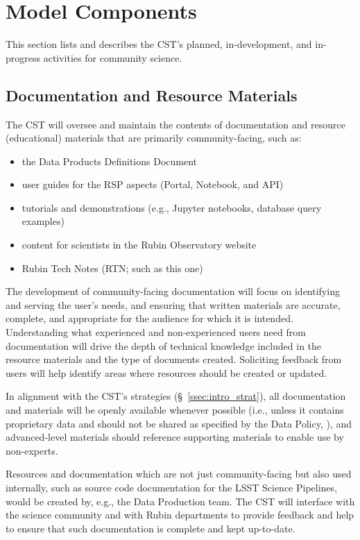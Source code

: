 \documentclass[DM,authoryear,toc]{lsstdoc}
\begin{document}
\section{Model Components}\label{sec:mod}

This section lists and describes the CST's planned, in-development, and in-progress activities for community science. 


\subsection{Documentation and Resource Materials}\label{ssec:mod_docs}

The CST will oversee and maintain the contents of documentation and resource (educational) materials that are primarily community-facing, such as:
\begin{itemize}
\item the Data Products Definitions Document 
\item user guides for the RSP aspects (Portal, Notebook, and API)
\item tutorials and demonstrations (e.g., Jupyter notebooks, database query examples)
\item content for scientists in the Rubin Observatory website
\item Rubin Tech Notes (RTN; such as this one)
\end{itemize}

The development of community-facing documentation will focus on identifying and serving the user's needs, and ensuring that written materials are accurate, complete, and appropriate for the audience for which it is intended.
Understanding what experienced and non-experienced users need from documentation will drive the depth of technical knowledge included in the resource materials and the type of documents created.
Soliciting feedback from users will help identify areas where resources should be created or updated.

In alignment with the CST's strategies (\S~\ref{ssec:intro_strat}), all documentation and materials will be openly available whenever possible (i.e., unless it contains proprietary data and should not be shared as specified by the Data Policy, ), and advanced-level materials should reference supporting materials to enable use by non-experts.

Resources and documentation which are not just community-facing but also used internally, such as source code documentation for the LSST Science Pipelines, would be created by, e.g., the Data Production team.
The CST will interface with the science community and with Rubin departments to provide feedback and help to ensure that such documentation is complete and kept up-to-date.
\end{document}
